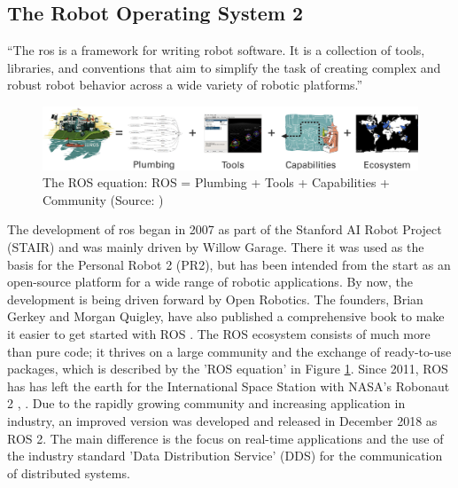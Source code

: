 \subsection{The Robot Operating System 2}
\begin{displayquote}
    \enquote{The \acrfull{ros} is a framework for writing robot software. It is a collection of tools, libraries, and conventions that aim to simplify the task of creating
    complex and robust robot behavior across a wide variety of robotic platforms.} \cite{Quigley.2015}
\end{displayquote}
    
\begin{figure}[h]
    \centering
    \includegraphics[width=1\textwidth]{figures/02_state_of_the_art/ros_equation.png}
    \caption{The ROS equation: ROS = Plumbing + Tools + Capabilities + Community (Source: \cite{OpenRobotics_About.2020})}
    \label{fig:ros_equation}
\end{figure}

The development of \gls{ros} began in 2007 as part of the Stanford AI Robot Project (STAIR) and was mainly driven by Willow Garage. There it was used as the basis for the Personal Robot 2 (PR2), but has been intended from the start as an open-source platform for a wide range of robotic applications. By now, the development is being driven forward by Open Robotics. The founders, Brian Gerkey and Morgan Quigley, have also published a comprehensive book to make it easier to get started with ROS \cite{Quigleyetal}. The ROS ecosystem consists of much more than pure code; it thrives on a large community and the exchange of ready-to-use packages, which is described by the 'ROS equation' in Figure \ref{fig:ros_equation}. Since 2011, ROS has has left the earth for the International Space Station with NASA's Robonaut 2 \cite{Diftleretal.2011}, \cite{Badgeretal.2016}. Due to the rapidly growing community and increasing application in industry, an improved version was developed and released in December 2018 as ROS 2. The main difference is the focus on real-time applications and the use of the industry standard 'Data Distribution Service' (DDS) for the communication of distributed systems.

